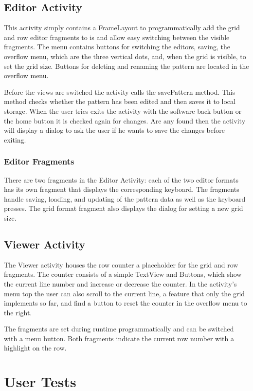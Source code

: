 \documentclass[a4paper,11pt]{kth-mag}
\begin{document}
\section{Editor Activity}
This activity simply contains a FrameLayout to programmatically add the grid and row editor fragments to is and allow easy switching between the visible fragments. The menu contains buttons for switching the editors, saving, the overflow menu, which are the three vertical dots, and, when the grid is visible, to set the grid size. Buttons for deleting and renaming the pattern are located in the overflow menu.

Before the views are switched the activity calls the savePattern method. This method checks whether the pattern has been edited and then saves it to local storage.
When the user tries exits the activity with the software back button or the home button it is checked again for changes. Are any found then the activity will display a dialog to ask the user if he wants to save the changes before exiting.

\subsection{Editor Fragments}
There are two fragments in the Editor Activity: each of the two editor formats has its own fragment that displays the corresponding keyboard. The fragments handle saving, loading, and updating of the pattern data as well as the keyboard presses.
The grid format fragment also displays the dialog for setting a new grid size.

\section{Viewer Activity}
The Viewer activity houses the row counter a placeholder for the grid and row fragments. The counter consists of a simple TextView and Buttons, which show the current line number and increase or decrease the counter. In the activity’s menu top the user can also scroll to the current line, a feature that only the grid implements so far, and find a button to reset the counter in the overflow menu to the right.

The fragments are set during runtime programmatically and can be switched with a menu button. Both fragments indicate the current row number with a highlight on the row.

\chapter{User Tests}
\end{document}
